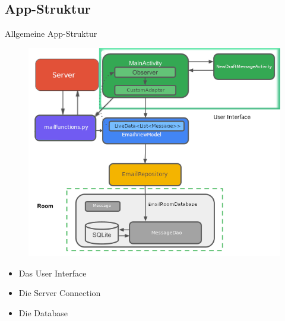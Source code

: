 \documentclass[aspectratio=169]{beamer}
\begin{document}
\subsection{App-Struktur}
\begin{frame}[plain]{Allgemeine App-Struktur}
\begin{varwidth}{.3\textwidth}
    \pause
        \begin{figure}
            \centering
            \includegraphics[height=.8\textheight]{../maturText/media/AppStructureFull.png}
        \end{figure}
    \end{varwidth}
    \hfill
    \begin{varwidth}{.5\textwidth}
        \begin{itemize}\pause
            \item Das User Interface \pause
            \item Die Server Connection \pause
            \item Die Database \pause
        \end{itemize}
    \end{varwidth} 
\end{frame}
\end{document}

